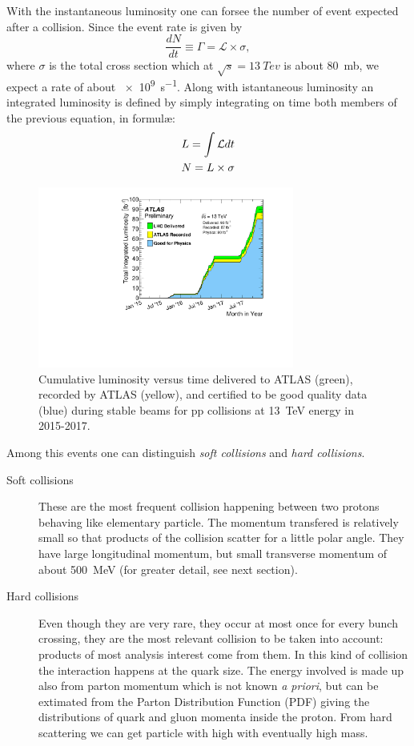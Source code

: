 With the instantaneous luminosity one can forsee the number of event expected after a collision. Since the event rate is given by 
\begin{equation}
\frac{dN}{dt}\equiv\Gamma=\mathcal{L}\times\sigma,
\end{equation}
where $\sigma$ is the total \pp cross section which at $\sqrt{s}=\SI{13}{Tev}$ is about \SI{80}{mb}, we expect a rate of about \SI{e9}{s^{-1}}. Along with istantaneous luminosity an integrated luminosity is defined by simply integrating on time both members of the previous equation, in formul\ae:
\begin{gather}
	L=\int{\mathcal{L}dt} \notag\\
	N=L\times\sigma
\end{gather} 

\begin{figure}[tp]
	\centering
	\includegraphics[width=0.75\textwidth]{LHC_ATLAS/intlumivstimeRun2DQ.pdf}
	\caption{Cumulative luminosity versus time delivered to ATLAS (green), recorded by ATLAS (yellow), and certified to be good quality data (blue) during stable beams for pp collisions at \SI{13}{TeV} \cm energy in 2015-2017.}
\end{figure}

Among this events one can distinguish \emph{soft collisions} and \emph{hard collisions}.
\begin{description}
\item[Soft collisions] These are the most frequent collision happening between two protons behaving like elementary particle. The momentum transfered is relatively small so that products of the collision scatter for a little polar angle. They have large longitudinal momentum, but small transverse momentum \pt of about \SI{500}{MeV} (for greater detail, see next section).
\item[Hard collisions] Even though they are very rare, they occur at most once for every bunch crossing, they are the most relevant collision to be taken into account: products of most analysis interest come from them. In this kind of collision the interaction happens at the quark size. The energy involved is made up also from parton momentum which is not known \emph{a priori}, but can be extimated from the Parton Distribution Function (PDF) giving the distributions of quark and gluon momenta inside the proton. From hard scattering we can get particle with high \pt with eventually high mass.
\end{description}

